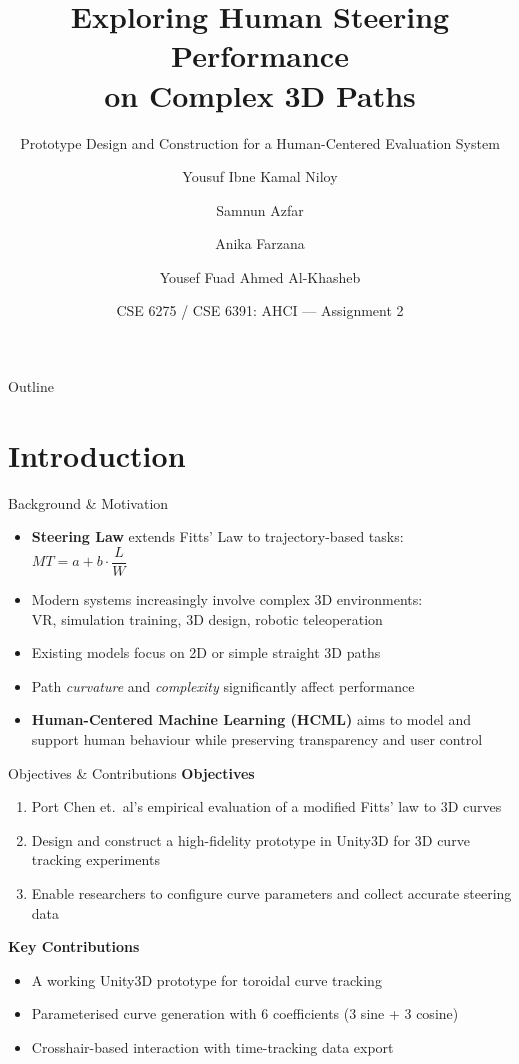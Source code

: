 \documentclass[aspectratio=169, 10pt]{beamer}
\title{Exploring Human Steering Performance\\on Complex 3D Paths}
\subtitle{Prototype Design and Construction for a Human-Centered Evaluation System}
\author{
  Yousuf Ibne Kamal Niloy \and
  Samnun Azfar \and
  Anika Farzana \and
  Yousef Fuad Ahmed Al-Khasheb
}
\institute{
  Department of Computer Science and Engineering\\
  Islamic University of Technology (IUT), OIC
}
\date{CSE 6275 / CSE 6391: AHCI --- Assignment 2}
\begin{document}
\begin{frame}[plain]
  \titlepage
\end{frame}

\begin{frame}{Outline}
  \tableofcontents
\end{frame}

\section{Introduction}

\begin{frame}{Background \& Motivation}
  \begin{itemize}
    \item \textbf{Steering Law} extends Fitts' Law to trajectory-based tasks:\\
          $MT = a + b \cdot \dfrac{L}{W}$
    \item Modern systems increasingly involve \alert{complex 3D environments}:\\
          VR, simulation training, 3D design, robotic teleoperation
    \item Existing models focus on 2D or simple straight 3D paths
    \item Path \emph{curvature} and \emph{complexity} significantly affect performance
    \item \textbf{Human-Centered Machine Learning (HCML)} aims to model and support
          human behaviour while preserving transparency and user control
  \end{itemize}
\end{frame}

\begin{frame}{Objectives \& Contributions}
  \textbf{Objectives}
  \begin{enumerate}
    \item Port Chen et.\ al's empirical evaluation of a modified Fitts' law to 3D curves \cite{chen2025curves}
    \item Design and construct a \alert{high-fidelity prototype} in Unity3D for 3D curve tracking experiments
    \item Enable researchers to configure curve parameters and collect accurate steering data
  \end{enumerate}

  \vspace{0.5em}
  \textbf{Key Contributions}
  \begin{itemize}
    \item A working Unity3D prototype for toroidal curve tracking
    \item Parameterised curve generation with 6 coefficients (3 sine + 3 cosine)
    \item Crosshair-based interaction with time-tracking data export
  \end{itemize}
\end{frame}
\end{document}
